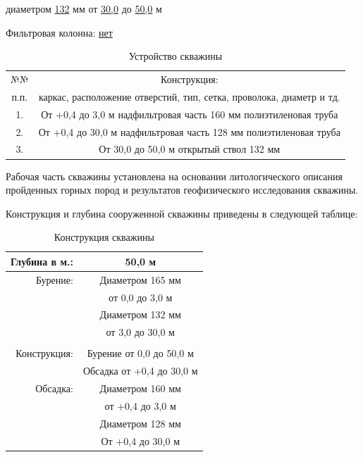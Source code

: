 \documentclass[a4paper,12pt]{article} %
\DeclareRobustCommand{\diameter}{%
	\text{\usefont{LS1}{stixscr}{m}{n}\symbol{"60}}%
}
\newcommand{\txtOgolovok}{+0,4}					%
\newcommand{\txtDepth}{50,0}					%
\newcommand{\txtCondMaterial}{полиэтиленовая}	%
\newcommand{\txtCondDiam}{160}					%
\newcommand{\txtCondBtm}{3,0}					%
\newcommand{\txtTubeMaterial}{полиэтиленовая}	%
\newcommand{\txtTubeDiam}{128}					%
\newcommand{\txtTubeBtm}{30,0}					%
\newcommand{\txtHoleDiam}{132}					%
\begin{document}
	 диаметром \underline{132} мм от \underline{\txtTubeBtm} до \underline{\txtDepth} м 
    
    \bigskip
	
	Фильтровая колонна: \underline{нет}
	
\begin{table}[!h]
\caption{Устройство скважины}
\centering
\begin{tabular}{|c|c|}
	\hline 
	№№ & Конструкция: \\ 
	п.п. & каркас, расположение отверстий, тип, сетка, проволока, диаметр и тд. \\ 
	\hline 
	1. & От {\txtOgolovok} до {\txtCondBtm} м   надфильтровая часть \diameter {\txtCondDiam} мм {\txtCondMaterial} труба \\ 
	\hline 
	2. & От {\txtOgolovok} до {\txtTubeBtm} м   надфильтровая часть \diameter {\txtTubeDiam} мм {\txtTubeMaterial} труба \\ 
	\hline 
	3. & От {\txtTubeBtm} до {\txtDepth} м   открытый ствол {\diameter} 132 мм \\ 
	\hline 
\end{tabular} 
\end{table}


Рабочая часть скважины установлена на основании литологического описания пройденных горных пород и результатов геофизического исследования скважины.

\newpage

Конструкция и глубина сооруженной скважины приведены в следующей таблице:

\bigskip

\begin{table}[!h]
	\caption{Конструкция скважины}
	\centering
\begin{tabular}{rc}
	\hline 
	Глубина в м.: & {\txtDepth} м \\ 
	\hline 
	Бурение: & Диаметром 165 мм \\ 
	& от 0,0 до {\txtCondBtm} м \\ 
	& Диаметром {\txtHoleDiam} мм \\ 
	& от {\txtCondBtm} до {\txtTubeBtm} м \\ 
	&  \\ 
	\hline 
	Конструкция: & Бурение от 0,0 до {\txtDepth} м \\ 
	& Обсадка от {\txtOgolovok} до {\txtTubeBtm} м \\ 
	\hline 
	Обсадка: & Диаметром {\txtCondDiam} мм \\ 
	& от {\txtOgolovok} до {\txtCondBtm} м \\ 
	& Диаметром {\txtTubeDiam} мм  \\ 
	& От {\txtOgolovok} до {\txtTubeBtm} м \\ 
	\hline 
\end{tabular} 
\end{table}
\end{document}
